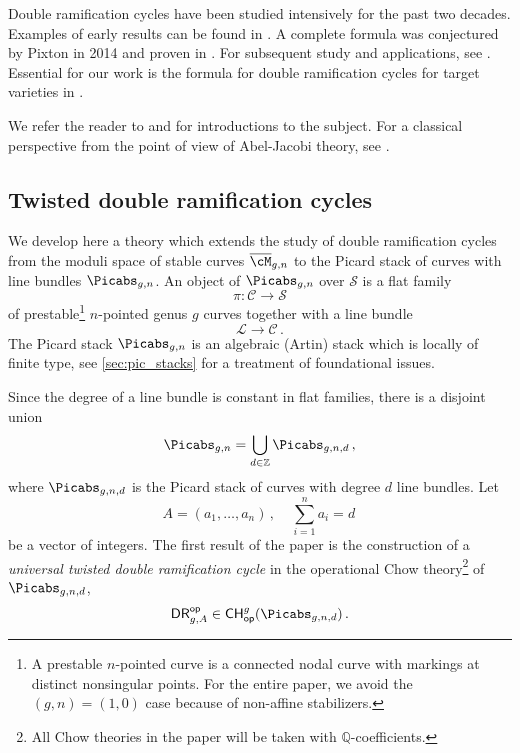 Double ramification cycles have been studied intensively for the
past two decades.
Examples of early results can be found in \cite{BSSZ,Cavalieri2011Polynomial-fami,cj,Faber2005Relative-maps-a,Grushevsky2012The-double-rami,Hain2013Normal-function,Marcus2013Stable-maps-to}.
A complete formula was conjectured by
Pixton in 2014 and proven in \cite{Janda2016Double-ramifica}.
For subsequent
study and applications, see \cite{Bae,BGR,CGJZ,FanWu,Farkas2016The-moduli-spac,Holmes2017Extending-the-d,Holmes2017Jacobian-extens,Holmes2017Multiplicativit,MPS20,ObPix,Pix18,Schmitt2016Dimension-theor,Tseng2,Tseng1}. Essential for our work is the formula for double ramification
cycles for target varieties in \cite{Janda2018Double-ramifica}.

We refer the
reader to \cite[Section 0]{Janda2016Double-ramifica} and \cite[Section 5]{RPSLC} for introductions to the subject. For a classical perspective from the point of view
of Abel-Jacobi theory, see
\cite{Holmes2017Extending-the-d}.



\subsection{Twisted double ramification cycles}
We develop here a theory which extends the study of double ramification
cycles from the moduli space of stable  curves $\overline{\cM}_{g,n}$ to the Picard stack of
curves with line bundles $\Picabs_{g,n}$.
An object of $\Picabs_{g,n}$ over $\mathcal{S}$ is
a flat family $$\pi:\mathcal{C} \rightarrow \mathcal{S}$$ of prestable{\footnote{A prestable $n$-pointed
curve is a connected nodal curve with markings at distinct nonsingular points.
For the entire paper, we avoid the $(g,n)=(1,0)$ case because of
non-affine stabilizers.}}
    $n$-pointed genus $g$ curves together with a line bundle
    $$\mathcal{L} \rightarrow \mathcal{C}\,. $$
The Picard stack $\Picabs_{g,n}$ is an algebraic (Artin) stack
which is locally of finite type, see \cref{sec:pic_stacks} for a treatment
of foundational issues.


Since the degree of a line bundle is constant in flat families, there is a
disjoint union
$$\Picabs_{g,n} =\bigcup_{d\in \mathbb{Z}}  \Picabs_{g,n,d}\, ,$$
where $\Picabs_{g,n,d}$ is the Picard stack of curves with degree $d$
line bundles.
Let $$A = (a_1, \dots, a_n)\,,\ \ \ \ \  \sum_{i=1}^n a_i=d \,$$
be a vector of integers.
The first result of the paper is the construction of a
{\em universal twisted double ramification
cycle} in the operational Chow theory{\footnote{All
Chow theories in the paper will be taken with $\mathbb{Q}$-coefficients.
}} of $\Picabs_{g,n,d}$,
$$\mathsf{DR}^{\mathsf{op}}_{g,A} \in {\mathsf{CH}}^g_{\mathsf{op}}(\Picabs_{g,n,d})\, .$$

